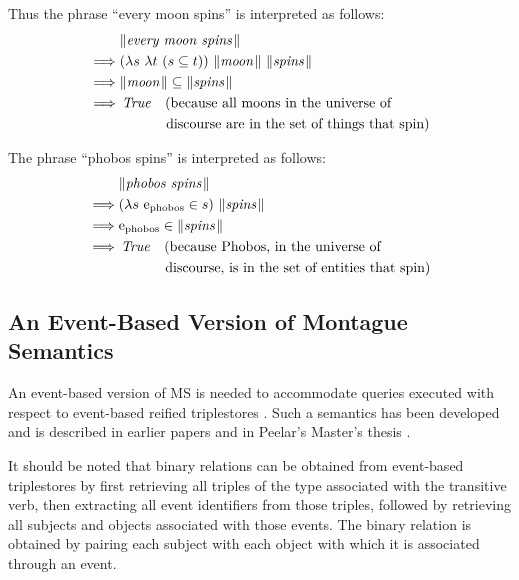 \documentclass[../main.tex]{subfiles}
\begin{document}
\begin{refsection}
Thus the phrase ``every moon spins'' is interpreted as follows:
\begin{equation*}
	\begin{split}
		&\meaningof{every moon spins}\\
		\implies& (\lambda s \ \lambda t \ (s \subseteq t)) \ \meaningof{moon} \ \meaningof{spins} \\
		\implies& \meaningof{moon}  \subseteq  \meaningof{spins} \\
		\implies& \True \quad (\dmathrm{because all moons in the universe of} \\
		&\dmathrm{\quad\qquad\ discourse are in the set of things that spin}) \\
	\end{split}
\end{equation*}

The phrase ``phobos spins'' is interpreted as follows:
\begin{equation*}
	\begin{split}
		&\meaningof{phobos spins}\\
		\implies& (\lambda s \ \entityassoc{\phobos} \in s) \ \meaningof{spins}\\
		\implies& \entityassoc{\phobos} \in  \meaningof{spins} \\
		\implies& \True \quad (\dmathrm{because Phobos, in the universe of} \\
		&\dmathrm{\quad\qquad\ discourse, is in the set of entities that spin})
	\end{split}
\end{equation*}
\subsection{An Event-Based Version of Montague Semantics}
\label{icsc2020conf:evflms}
An event-based version of MS is needed to accommodate queries executed with respect to event-based reified triplestores \cite{graphmqslide}. Such a semantics has been developed and is described in
earlier papers \cite{graphmqslide, frost2014demonstration} and in Peelar's Master's thesis \cite{peelar2016accommodating}.

It should be noted that binary relations can be obtained from event-based triplestores by first retrieving
all triples of the type associated with the transitive verb, then extracting all event identifiers from those
triples, followed by retrieving all subjects and objects associated with those events. The binary relation
is obtained by pairing each subject with each object with which it is associated through an event.


\end{refsection}
\end{document}
